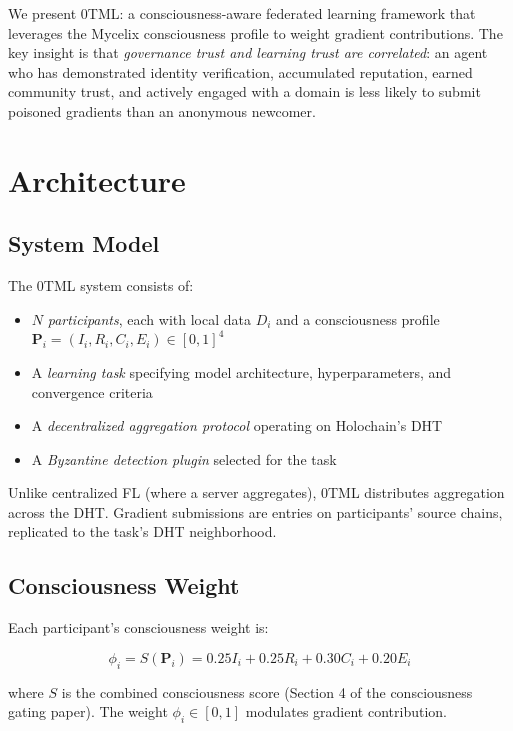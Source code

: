 \documentclass[11pt,twocolumn]{article}
\begin{document}
We present 0TML: a consciousness-aware federated learning framework that leverages
the Mycelix consciousness profile to weight gradient contributions. The key
insight is that \emph{governance trust and learning trust are correlated}: an
agent who has demonstrated identity verification, accumulated reputation, earned
community trust, and actively engaged with a domain is less likely to submit
poisoned gradients than an anonymous newcomer.

\section{Architecture}

\subsection{System Model}

The 0TML system consists of:

\begin{itemize}[nosep]
  \item $N$ \emph{participants}, each with local data $D_i$ and a consciousness
    profile $\mathbf{P}_i = (I_i, R_i, C_i, E_i) \in [0,1]^4$
  \item A \emph{learning task} specifying model architecture, hyperparameters,
    and convergence criteria
  \item A \emph{decentralized aggregation protocol} operating on Holochain's DHT
  \item A \emph{Byzantine detection plugin} selected for the task
\end{itemize}

Unlike centralized FL (where a server aggregates), 0TML distributes aggregation
across the DHT. Gradient submissions are entries on participants' source chains,
replicated to the task's DHT neighborhood.

\subsection{Consciousness Weight}

Each participant's consciousness weight is:

\begin{equation}
  \phi_i = S(\mathbf{P}_i) = 0.25 I_i + 0.25 R_i + 0.30 C_i + 0.20 E_i
\end{equation}

where $S$ is the combined consciousness score (Section 4 of the consciousness
gating paper). The weight $\phi_i \in [0, 1]$ modulates gradient contribution.
\end{document}
